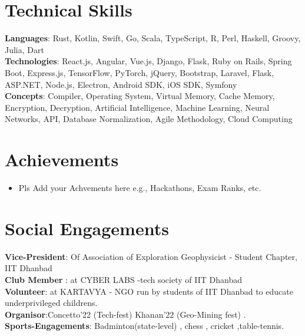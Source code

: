 \documentclass[letterpaper,11pt]{article}
\begin{document}
   

\resumeSubHeadingListEnd
\section{Technical Skills}
    \begin{itemize}[leftmargin=0.15in, label={}]
	\small{\item{
		\textbf{Languages}{: Rust, Kotlin, Swift, Go, Scala, TypeScript, R, Perl, Haskell, Groovy, Julia, Dart} \\
		\textbf{Technologies}{: React.js, Angular, Vue.js, Django, Flask, Ruby on Rails, Spring Boot, Express.js, TensorFlow, PyTorch, jQuery, Bootstrap, Laravel, Flask, ASP.NET, Node.js, Electron, Android SDK, iOS SDK, Symfony} \\
		\textbf{Concepts}{: Compiler, Operating System, Virtual Memory, Cache Memory, Encryption, Decryption, Artificial Intelligence, Machine Learning, Neural Networks, API, Database Normalization, Agile Methodology, Cloud Computing}
	}}
    \end{itemize}

\section{Achievements}
\begin{itemize} %
    \item Pls Add your Achvements here e.g., Hackathons, Exam Ranks, etc.
\end{itemize} %

\section{Social Engagements}
    \begin{itemize}[leftmargin=0.15in, label={}]
	\small{\item{
		\textbf{Vice-President}{: Of Association of Exploration Geophysicist - Student Chapter, IIT Dhanbad} \\
		\textbf{Club Member}{ : at CYBER LABS -tech society of IIT Dhanbad } \\
		\textbf{Volunteer}{: at KARTAVYA - NGO run by students of IIT Dhanbad to educate underprivileged childrens.} \\
  		\textbf{Organisor}{:Concetto'22 (Tech-fest)  Khanan'22 (Geo-Mining fest) .} \\
        \textbf{Sports-Engagements}{: Badminton(state-level) , chess , cricket ,table-tennis.}
	}}
    \end{itemize}


\end{document}
